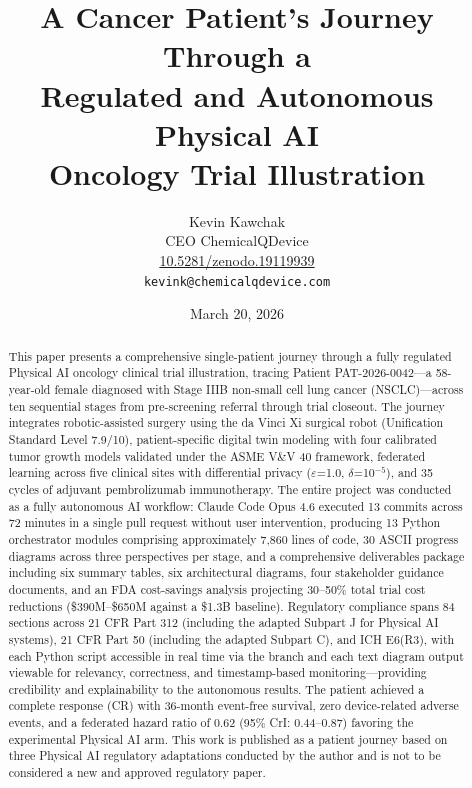 \documentclass{article}
\title{A Cancer Patient's Journey Through a\\Regulated and Autonomous Physical AI\\Oncology Trial Illustration}
\author{
  Kevin Kawchak\hspace{2pt}\orcidicon{0009-0007-5457-8667} \\
  CEO ChemicalQDevice\\
  \href{https://doi.org/10.5281/zenodo.19119939}{10.5281/zenodo.19119939} \\
  \texttt{kevink@chemicalqdevice.com}
}
\date{March 20, 2026}
\begin{document}
\maketitle

\begin{abstract}
This paper presents a comprehensive single-patient journey through a fully regulated Physical AI oncology clinical trial illustration, tracing Patient PAT-2026-0042---a 58-year-old female diagnosed with Stage IIIB non-small cell lung cancer (NSCLC)---across ten sequential stages from pre-screening referral through trial closeout. The journey integrates robotic-assisted surgery using the da Vinci Xi surgical robot (Unification Standard Level 7.9/10), patient-specific digital twin modeling with four calibrated tumor growth models validated under the ASME V\&V 40 framework, federated learning across five clinical sites with differential privacy ($\varepsilon$=1.0, $\delta$=10$^{-5}$), and 35 cycles of adjuvant pembrolizumab immunotherapy. The entire project was conducted as a fully autonomous AI workflow: Claude Code Opus 4.6 executed 13 commits across 72 minutes in a single pull request without user intervention, producing 13 Python orchestrator modules comprising approximately 7,860 lines of code, 30 ASCII progress diagrams across three perspectives per stage, and a comprehensive deliverables package including six summary tables, six architectural diagrams, four stakeholder guidance documents, and an FDA cost-savings analysis projecting 30--50\% total trial cost reductions (\$390M--\$650M against a \$1.3B baseline). Regulatory compliance spans 84 sections across 21 CFR Part 312 (including the adapted Subpart J for Physical AI systems), 21 CFR Part 50 (including the adapted Subpart C), and ICH E6(R3), with each Python script accessible in real time via the branch and each text diagram output viewable for relevancy, correctness, and timestamp-based monitoring---providing credibility and explainability to the autonomous results. The patient achieved a complete response (CR) with 36-month event-free survival, zero device-related adverse events, and a federated hazard ratio of 0.62 (95\% CrI: 0.44--0.87) favoring the experimental Physical AI arm. This work is published as a patient journey based on three Physical AI regulatory adaptations conducted by the author and is not to be considered a new and approved regulatory paper.
\end{abstract}

\end{document}
